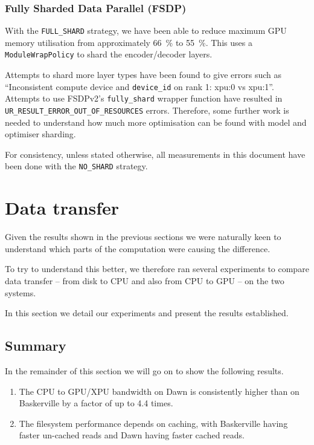 \subsubsection{Fully Sharded Data Parallel (FSDP)}

With the \texttt{FULL\_SHARD} strategy, we have been able to reduce maximum GPU memory utilisation from approximately \qty{66}{\percent} to \qty{55}{\percent}. This uses a \texttt{ModuleWrapPolicy} to shard the encoder/decoder layers.

Attempts to shard more layer types have been found to give errors such as ``Inconsistent compute device and \texttt{device\_id} on rank 1: xpu:0 vs xpu:1''.  Attempts to use FSDPv2's \texttt{fully\_shard} wrapper function have resulted in \texttt{UR\_RESULT\_ERROR\_OUT\_OF\_RESOURCES} errors. Therefore, some further work is needed to understand how much more optimisation can be found with model and optimiser sharding.

For consistency, unless stated otherwise, all measurements in this document have been done with the \texttt{NO\_SHARD} strategy.

\section{Data transfer}

Given the results shown in the previous sections we were naturally keen to understand which parts of the computation were causing the difference.

To try to understand this better, we therefore ran several experiments to compare data transfer -- from disk to CPU and also from CPU to GPU -- on the two systems.

In this section we detail our experiments and present the results established.

\subsection{Summary}

In the remainder of this section we will go on to show the following results.

\begin{enumerate}
\item The CPU to GPU/XPU bandwidth on Dawn is consistently higher than on Baskerville by a factor of up to 4.4 times.
\item The filesystem performance depends on caching, with Baskerville having faster un-cached reads and Dawn having faster cached reads.
\end{enumerate}

